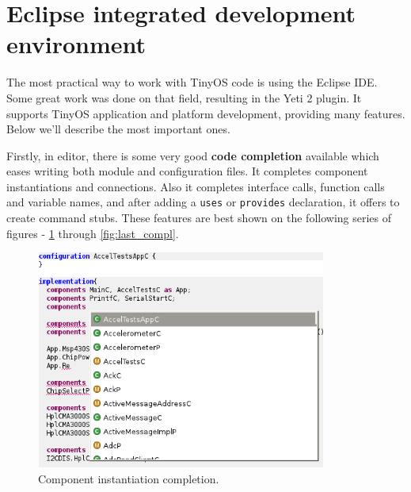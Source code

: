 \section{Eclipse integrated development environment}

The most practical way to work with TinyOS code is using the Eclipse
IDE. Some great work was done on that field, resulting in the Yeti 2
plugin. It supports TinyOS application and platform development,
providing many features. Below we'll describe the most important ones.

Firstly, in editor, there is some very good {\bf code completion} available
which eases writing both module and configuration files. It completes
component instantiations and connections. Also it completes interface
calls, function calls and variable names, and after adding a
\texttt{uses} or \texttt{provides} declaration, it offers to create
command stubs. These features are best shown on the following series of
figures - \ref{fig:first_compl} through \ref{fig:last_compl}.

\begin{figure}[h]
  \centering
  \includegraphics[width=0.85\textwidth]{img/eclipse_compl1.png}
  \caption{Component instantiation completion.}
  \label{fig:first_compl}
\end{figure}

